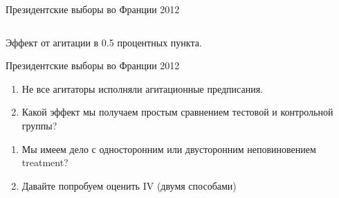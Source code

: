 \begin{frame}{Президентские выборы во Франции 2012 \parencite{pons2018will}}
\begin{columns}
\end{columns}
Эффект от агитации в 0.5 процентных пункта. 
\end{frame}


\begin{frame}{Президентские выборы во Франции 2012 \parencite{pons2018will}}

\begin{enumerate}
    \item Не все агитаторы исполняли агитационные предписания.
    \item Какой эффект мы получаем простым сравнением тестовой и контрольной группы?
\end{enumerate}

\begin{enumerate}
    \item Мы имеем дело с односторонним или двусторонним неповиновением treatment?
    \item Давайте попробуем оценить IV (двумя способами)
\end{enumerate}

\end{frame}



